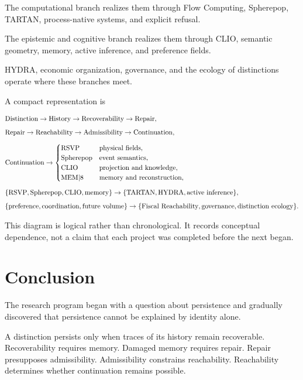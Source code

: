 \documentclass[11pt,oneside]{book}
\numberwithin{equation}{chapter}
\theoremstyle{definition}
\theoremstyle{plain}
\begin{document}
The computational branch realizes them through Flow Computing, Spherepop,
TARTAN, process-native systems, and explicit refusal.

The epistemic and cognitive branch realizes them through CLIO, semantic
geometry, memory, active inference, and preference fields.

HYDRA, economic organization, governance, and the ecology of distinctions
operate where these branches meet.

A compact representation is

\[
\begin{aligned}
&\text{Distinction}
\rightarrow
\text{History}
\rightarrow
\text{Recoverability}
\rightarrow
\text{Repair},
\\[0.5em]
&\text{Repair}
\rightarrow
\text{Reachability}
\rightarrow
\text{Admissibility}
\rightarrow
\text{Continuation},
\\[0.5em]
&\text{Continuation}
\rightarrow
\begin{cases}
\text{RSVP} & \text{physical fields},\\
\text{Spherepop} & \text{event semantics},\\
\text{CLIO} & \text{projection and knowledge},\\
\text{MEM\textbar 8} & \text{memory and reconstruction},
\end{cases}
\\[0.5em]
&\{\text{RSVP},\text{Spherepop},\text{CLIO},\text{memory}\}
\rightarrow
\{\text{TARTAN},\text{HYDRA},\text{active inference}\},
\\[0.5em]
&\{\text{preference},\text{coordination},\text{future volume}\}
\rightarrow
\{\text{Fiscal Reachability},\text{governance},\text{distinction ecology}\}.
\end{aligned}
\]

This diagram is logical rather than chronological. It records conceptual
dependence, not a claim that each project was completed before the next
began.

\section{Conclusion}

The research program began with a question about persistence and gradually
discovered that persistence cannot be explained by identity alone.

A distinction persists only when traces of its history remain recoverable.
Recoverability requires memory. Damaged memory requires repair. Repair
presupposes admissibility. Admissibility constrains reachability.
Reachability determines whether continuation remains possible.
\end{document}
